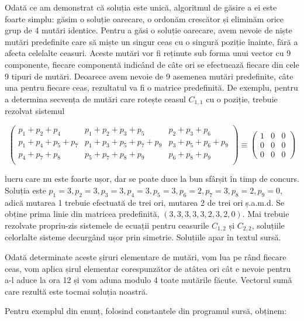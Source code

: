 Odată ce am demonstrat că soluția este unică, algoritmul de găsire a ei este
foarte simplu: găsim o soluție oarecare, o ordonăm crescător și eliminăm orice
grup de 4 mutări identice. Pentru a găsi o soluție oarecare, avem nevoie de
niște mutări predefinite care să miște un singur ceas cu o singură poziție
înainte, fără a afecta celelalte ceasuri. Aceste mutări vor fi reținute sub
forma unui vector cu 9 componente, fiecare componentă indicând de câte ori se
efectuează fiecare din cele 9 tipuri de mutări. Deoarece avem nevoie de 9
asemenea mutări predefinite, câte una pentru fiecare ceas, rezultatul va fi o
matrice predefinită. De exemplu, pentru a determina secvența de mutări care
rotește ceasul $C_{1,1}$ cu o poziție, trebuie rezolvat sistemul

\begin{equation}
  \begin{pmatrix}
    p_1 + p_2 + p_4 & p_1 + p_2 + p_3 + p_5 & p_2 + p_3 + p_6 \\
    p_1 + p_4 + p_5 + p_7 & p_1 + p_3 + p_5 + p_7 + p_9 & p_3 + p_5 + p_6 + p_9 \\
    p_4 + p_7 + p_8 & p_5 + p_7 + p_8 + p_9 & p_6 + p_8 + p_9 \\
  \end{pmatrix}
  \equiv
  \begin{pmatrix}
    1 & 0 & 0 \\
    0 & 0 & 0 \\
    0 & 0 & 0
  \end{pmatrix}
\end{equation}

lucru care nu este foarte ușor, dar se poate duce la bun sfârșit în timp de
concurs. Soluția este $p_1=3, p_2=3, p_3=3, p_4=3, p_5=3, p_6=2, p_7=3, p_8=2,
p_9=0$, adică mutarea 1 trebuie efectuată de trei ori, mutarea 2 de trei ori
ș.a.m.d. Se obține prima linie din matricea predefinită, $(3, 3, 3, 3, 3, 2,
3, 2, 0)$. Mai trebuie rezolvate propriu-zis sistemele de ecuații pentru
ceasurile $C_{1,2}$ și $C_{2,2}$, soluțiile celorlalte sisteme decurgând ușor
prin simetrie. Soluțiile apar în textul sursă.

Odată determinate aceste șiruri elementare de mutări, vom lua pe rând fiecare
ceas, vom aplica șirul elementar corespunzător de atâtea ori cât e nevoie
pentru a-l aduce la ora 12 și vom aduna modulo 4 toate mutările
făcute. Vectorul sumă care rezultă este tocmai soluția noastră.

Pentru exemplul din enunț, folosind constantele din programul sursă, obținem:


